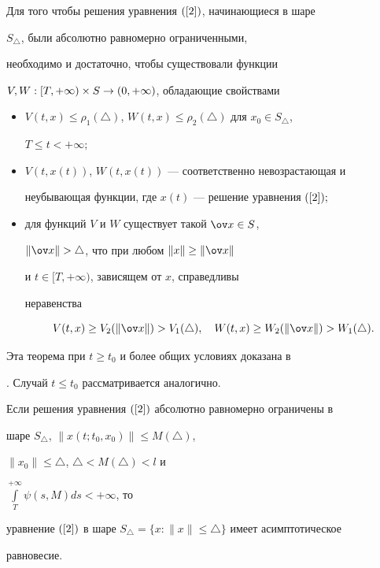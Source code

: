 \begin{thm}\label{T_4}


Для того чтобы решения уравнения $(\ref{2})$, начинающиеся в шаре


$S_{\triangle}$, были абсолютно равномерно ограниченными,


необходимо и достаточно, чтобы существовали функции


$V,W:[T,+\infty)\times S


\rar (0,+\infty)$, обладающие свойствами


\begin{itemize}


\item[a)] $V(t,x)\leq \rho_{1}(\triangle)$, $W(t,x)\leq


\rho_{2}(\triangle)$ для $x_{0}\in S_{\triangle}$,


$T\leq t<+\infty;$


\item[b)] $V(t,x(t))$, $W(t,x(t))$ --- соответственно невозрастающая и


неубывающая функции, где $x(t)$ --- решение уравнения $(\ref{2});$


\item[c)] для функций $V$ и $W$ существует такой $\ov x \in S$,


$\|\ov x\|>\triangle$, что при любом $\|x\| \geq \|\ov x\|$


и $t \in [T,+\infty)$, зависящем от $x$, справедливы


неравенства


$$


V(t,x) \geq V_{2}(\|\ov x \|)>V_{1}(\triangle),\quad


W(t,x) \geq W_{2}(\|\ov x \|)>W_{1}(\triangle).


$$


\end{itemize}


\end{thm}





Эта теорема при $t\geq t_{0}$ и более общих условиях доказана в


\cite{8}. Случай $t\leq t_{0}$ рассматривается аналогично.





\begin{thm}\label{T_5}


Если решения уравнения $(\ref{2})$ абсолютно равномерно ограничены в


шаре $S_{\triangle}$, $\|x(t;t_{0},x_{0})\| \leq M(\triangle)$,


$\|x_{0}\|\leq \triangle$, $\triangle <M(\triangle)<l$ и


$\int\limits_{T}^{+\infty}\psi(s,M)ds<+\infty$, то


уравнение $(\ref{2})$ в шаре $S_{\triangle}= \lbrace


x:\|x\| \leq \triangle\rbrace$ имеет асимптотическое


равновесие.


\end{thm}





